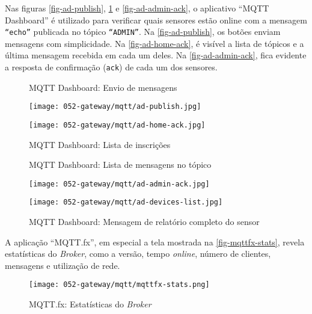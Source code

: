 Nas figuras \ref{fig-ad-publish}, \ref{fig-ad-home-ack} e \ref{fig-ad-admin-ack},
o aplicativo ``MQTT Dashboard'' é utilizado para verificar quais sensores
estão online com a mensagem \texttt{``echo''} publicada no tópico \texttt{``ADMIN''}. Na
\autoref{fig-ad-publish}, os botões enviam mensagens com simplicidade. Na
\autoref{fig-ad-home-ack}, é visível a lista de tópicos e a última mensagem
recebida em cada um deles. Na \autoref{fig-ad-admin-ack}, fica evidente a
resposta de confirmação (\texttt{ack}) de cada um dos sensores.

\begin{figure}[htb]
	\centering
	\begin{minipage}{0.49\textwidth}
		\centering
		\caption{\label{fig-ad-publish}MQTT Dashboard: Envio de mensagens}
		\texttt{[image: 052-gateway/mqtt/ad-publish.jpg]}
	\end{minipage}
	\hfill
	\begin{minipage}{0.49\textwidth}
		\centering
		\caption{\label{fig-ad-home-ack}MQTT Dashboard: Lista de inscrições}
		\texttt{[image: 052-gateway/mqtt/ad-home-ack.jpg]}
	\end{minipage}
\end{figure}

\begin{figure}[htb]
	\centering
	\begin{minipage}{0.49\textwidth}
		\centering
		\caption{\label{fig-ad-admin-ack}MQTT Dashboard: Lista de mensagens no tópico}
		\texttt{[image: 052-gateway/mqtt/ad-admin-ack.jpg]}
	\end{minipage}
	\hfill
	\begin{minipage}{0.49\textwidth}
		\centering
		\caption{\label{fig-ad-devices-list}MQTT Dashboard: Mensagem de relatório completo do sensor}
		\texttt{[image: 052-gateway/mqtt/ad-devices-list.jpg]}
	\end{minipage}
\end{figure}

\FloatBarrier

A aplicação ``MQTT.fx'', em especial a tela mostrada na
\autoref{fig-mqttfx-stats}, revela estatísticas do \emph{Broker}, como a versão,
tempo \emph{online}, número de clientes, mensagens e utilização de rede.

\begin{figure}[htb]
	\centering
	\caption{\label{fig-mqttfx-stats}MQTT.fx: Estatísticas do \emph{Broker}}
	\texttt{[image: 052-gateway/mqtt/mqttfx-stats.png]}
\end{figure}

